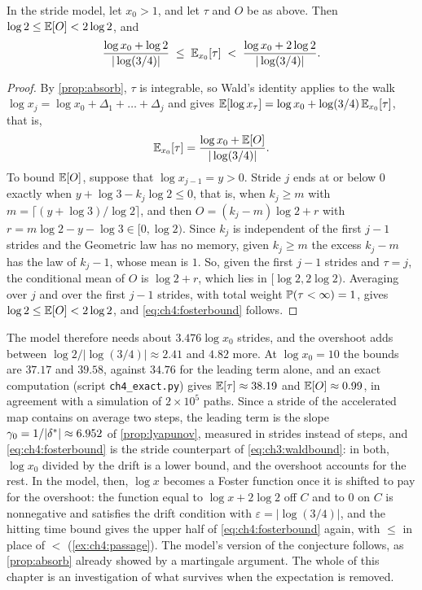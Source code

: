 \begin{proposition}\label{prop:ch4:passage}
In the stride model, let $x_0>1$, and let $\tau$ and $O$ be as above. Then $\log2\le\mathbb{E}[O]<2\log2$, and
\begin{equation}\label{eq:ch4:fosterbound}
  \frac{\log x_0+\log2}{|\log(3/4)|}\;\le\;\mathbb{E}_{x_0}[\tau]\;<\;\frac{\log x_0+2\log2}{|\log(3/4)|}.
\end{equation}
\end{proposition}

\begin{proof}
By \cref{prop:absorb}, $\tau$ is integrable, so Wald's identity applies to the walk $\log x_j=\log x_0+\Delta_1+\dots+\Delta_j$ and gives $\mathbb{E}[\log x_\tau]=\log x_0+\log(3/4)\,\mathbb{E}_{x_0}[\tau]$, that is,
\[
  \mathbb{E}_{x_0}[\tau]=\frac{\log x_0+\mathbb{E}[O]}{|\log(3/4)|}.
\]
To bound $\mathbb{E}[O]$, suppose that $\log x_{j-1}=y>0$. Stride $j$ ends at or below $0$ exactly when $y+\log3-k_j\log2\le0$, that is, when $k_j\ge m$ with $m=\lceil(y+\log3)/\log2\rceil$, and then $O=(k_j-m)\log2+r$ with $r=m\log2-y-\log3\in[0,\log2)$. Since $k_j$ is independent of the first $j-1$ strides and the Geometric law has no memory, given $k_j\ge m$ the excess $k_j-m$ has the law of $k_j-1$, whose mean is $1$. So, given the first $j-1$ strides and $\tau=j$, the conditional mean of $O$ is $\log2+r$, which lies in $[\log2,2\log2)$. Averaging over $j$ and over the first $j-1$ strides, with total weight $\mathbb{P}(\tau<\infty)=1$, gives $\log2\le\mathbb{E}[O]<2\log2$, and \eqref{eq:ch4:fosterbound} follows.
\end{proof}

The model therefore needs about $3.476\log x_0$ strides, and the overshoot adds between $\log2/|\log(3/4)|\approx2.41$ and $4.82$ more. At $\log x_0=10$ the bounds are $37.17$ and $39.58$, against $34.76$ for the leading term alone, and an exact computation (script \texttt{ch4\_exact.py}) gives $\mathbb{E}[\tau]\approx38.19$ and $\mathbb{E}[O]\approx0.99$, in agreement with a simulation of $2\times10^5$ paths. Since a stride of the accelerated map contains on average two steps, the leading term is the slope $\gamma_0=1/|\delta^{*}|\approx6.952$ of \cref{prop:lyapunov}, measured in strides instead of steps, and \eqref{eq:ch4:fosterbound} is the stride counterpart of \eqref{eq:ch3:waldbound}: in both, $\log x_0$ divided by the drift is a lower bound, and the overshoot accounts for the rest. In the model, then, $\log x$ becomes a Foster function once it is shifted to pay for the overshoot: the function equal to $\log x+2\log2$ off $C$ and to $0$ on $C$ is nonnegative and satisfies the drift condition with $\varepsilon=|\log(3/4)|$, and the hitting time bound gives the upper half of \eqref{eq:ch4:fosterbound} again, with $\le$ in place of $<$ (\cref{ex:ch4:passage}). The model's version of the conjecture follows, as \cref{prop:absorb} already showed by a martingale argument. The whole of this chapter is an investigation of what survives when the expectation is removed.

